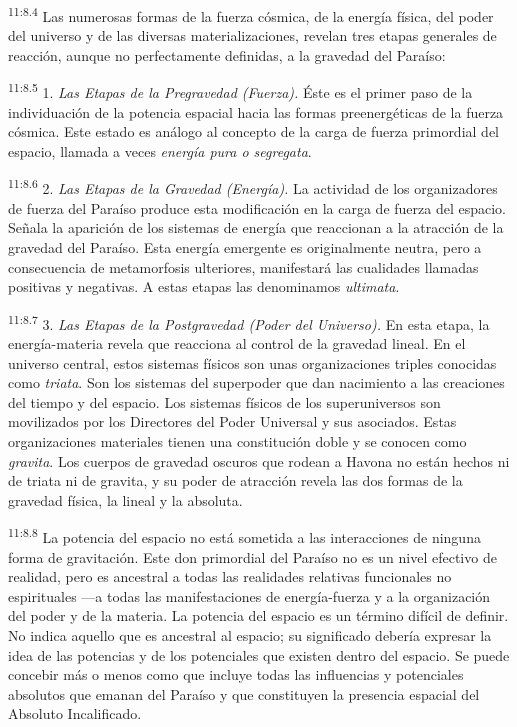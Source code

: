 \par
\textsuperscript{11:8.4} Las numerosas formas de la fuerza cósmica, de la energía física, del poder del universo y de las diversas materializaciones, revelan tres etapas generales de reacción, aunque no perfectamente definidas, a la gravedad del Paraíso:

\par
\textsuperscript{11:8.5} 1. \textit{Las Etapas de la Pregravedad (Fuerza).} Éste es el primer paso de la individuación de la potencia espacial hacia las formas preenergéticas de la fuerza cósmica. Este estado es análogo al concepto de la carga de fuerza primordial del espacio, llamada a veces \textit{energía pura o segregata}.

\par
\textsuperscript{11:8.6} 2. \textit{Las Etapas de la Gravedad (Energía).} La actividad de los organizadores de fuerza del Paraíso produce esta modificación en la carga de fuerza del espacio. Señala la aparición de los sistemas de energía que reaccionan a la atracción de la gravedad del Paraíso. Esta energía emergente es originalmente neutra, pero a consecuencia de metamorfosis ulteriores, manifestará las cualidades llamadas positivas y negativas. A estas etapas las denominamos \textit{ultimata}.

\par
\textsuperscript{11:8.7} 3. \textit{Las Etapas de la Postgravedad (Poder del Universo).} En esta etapa, la energía-materia revela que reacciona al control de la gravedad lineal. En el universo central, estos sistemas físicos son unas organizaciones triples conocidas como \textit{triata}. Son los sistemas del superpoder que dan nacimiento a las creaciones del tiempo y del espacio. Los sistemas físicos de los superuniversos son movilizados por los Directores del Poder Universal y sus asociados. Estas organizaciones materiales tienen una constitución doble y se conocen como \textit{gravita}. Los cuerpos de gravedad oscuros que rodean a Havona no están hechos ni de triata ni de gravita, y su poder de atracción revela las dos formas de la gravedad física, la lineal y la absoluta.

\par
\textsuperscript{11:8.8} La potencia del espacio no está sometida a las interacciones de ninguna forma de gravitación. Este don primordial del Paraíso no es un nivel efectivo de realidad, pero es ancestral a todas las realidades relativas funcionales no espirituales ---a todas las manifestaciones de energía-fuerza y a la organización del poder y de la materia. La potencia del espacio es un término difícil de definir. No indica aquello que es ancestral al espacio; su significado debería expresar la idea de las potencias y de los potenciales que existen dentro del espacio. Se puede concebir más o menos como que incluye todas las influencias y potenciales absolutos que emanan del Paraíso y que constituyen la presencia espacial del Absoluto Incalificado.

